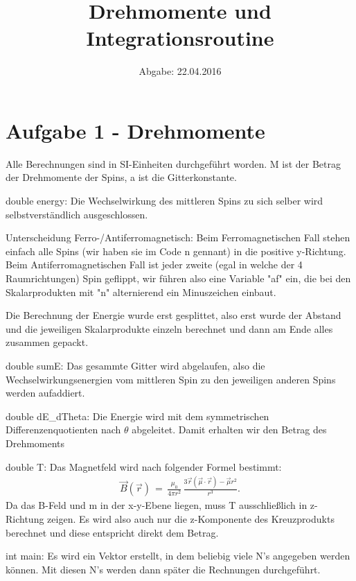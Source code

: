 

\subject{Blatt 01}
\title{Drehmomente und Integrationsroutine}
\date{
  Abgabe: 22.04.2016
}

\setlength\LTleft{-2cm}
\setlength\LTright{0pt}




\maketitle
\section{Aufgabe 1 - Drehmomente}
Alle Berechnungen sind in SI-Einheiten durchgeführt worden.
M ist der Betrag der Drehmomente der Spins, a ist die Gitterkonstante.

double energy:
Die Wechselwirkung des mittleren Spins zu sich selber wird selbstverständlich ausgeschlossen.

Unterscheidung Ferro-/Antiferromagnetisch: Beim Ferromagnetischen Fall stehen einfach alle Spins (wir haben sie im Code n gennant) in die positive y-Richtung.
Beim Antiferromagnetischen Fall ist jeder zweite (egal in welche der 4 Raumrichtungen) Spin geflippt, wir führen also eine Variable "af" ein, die bei den Skalarprodukten mit "n" alternierend ein Minuszeichen einbaut.

Die Berechnung der Energie wurde erst gesplittet, also erst wurde der Abstand und die jeweiligen Skalarprodukte einzeln berechnet und dann am Ende alles zusammen gepackt.


double sumE:
Das gesammte Gitter wird abgelaufen, also die Wechselwirkungsenergien vom mittleren Spin zu den jeweiligen anderen Spins werden aufaddiert.

double dE\_dTheta:
Die Energie wird mit dem symmetrischen Differenzenquotienten nach $\theta$ abgeleitet.
Damit erhalten wir den Betrag des Drehmoments

double T:
Das Magnetfeld wird nach folgender Formel bestimmt:
\begin{align*}
	\vec{B}(\vec{r})\,=\,\frac{\mu_0}{4 \pi r^2}\,\frac{3\vec{r}(\vec{\mu}\cdot\vec{r}) - \vec{\mu}r^2}{r^3}.
\end{align*}
Da das B-Feld und m in der x-y-Ebene liegen, muss T ausschließlich in z-Richtung zeigen.
Es wird also auch nur die z-Komponente des Kreuzprodukts berechnet und diese entspricht direkt dem Betrag.

int main:
Es wird ein Vektor erstellt, in dem beliebig viele N's angegeben werden können.
Mit diesen N's werden dann später die Rechnungen durchgeführt.

